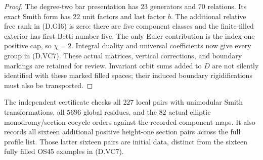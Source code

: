 \begin{proof}
The degree-two bar presentation has $23$ generators and $70$
relations. Its exact Smith form has $22$ unit factors and last
factor $b$. The additional relative free rank in (D.GI6) is zero:
there are five component classes and the finite-filled exterior
has first Betti number five. The only Euler contribution is the
index-one positive cap, so $\chi=2$. Integral duality and universal
coefficients now give every group in (D.VC7).
These actual matrices, vertical corrections, and boundary markings
are retained for review. Invariant orbit sums added to $D$ are not
silently identified with these marked filled spaces; their induced
boundary rigidifications must also be transported.
\end{proof}

The independent certificate
checks all $227$ local pairs with unimodular Smith transformations,
all $5696$ global residues, and the $82$ actual elliptic
monodromy/section-cocycle orders against the recorded component
maps. It also records all sixteen additional positive height-one
section pairs across the full profile list. Those latter sixteen
pairs are initial data, distinct from the sixteen fully filled
OS45 examples in (D.VC7).
